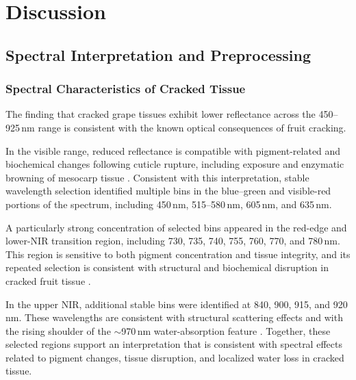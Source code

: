 \chapter{Discussion}
\label{chap:discussion}


\section{Spectral Interpretation and Preprocessing}
\label{sec:physiology_preprocessing}

\subsection{Spectral Characteristics of Cracked Tissue}
\noindent
The finding that cracked grape tissues exhibit lower reflectance across the 450--925\,nm range is consistent with the known optical consequences of fruit cracking.

\medskip\noindent
In the visible range, reduced reflectance is compatible with pigment-related and biochemical changes following cuticle rupture, including exposure and enzymatic browning of mesocarp tissue \parencite{Wang2015FruitQualitySpectroscopy, Gitelson1994ChlorophyllReflectance, santos2023molecular, Moon2020EnzymaticBrowning}. Consistent with this interpretation, stable wavelength selection identified multiple bins in the blue--green and visible-red portions of the spectrum, including 450\,nm, 515--580\,nm, 605\,nm, and 635\,nm.

\medskip\noindent
A particularly strong concentration of selected bins appeared in the red-edge and lower-NIR transition region, including 730, 735, 740, 755, 760, 770, and 780\,nm. This region is sensitive to both pigment concentration and tissue integrity, and its repeated selection is consistent with structural and biochemical disruption in cracked fruit tissue \parencite{Lu2020OpticalPropertiesReview, Imran2020RedEdgeNIRShoulder}.

\medskip\noindent
In the upper NIR, additional stable bins were identified at 840, 900, 915, and 920\,nm. These wavelengths are consistent with structural scattering effects and with the rising shoulder of the $\sim$970\,nm water-absorption feature \parencite{Cheng2019AppleDRS, Sun2021PeachBruisingOptical, Munera2021PersimmonDamageHSI}. Together, these selected regions support an interpretation that is consistent with spectral effects related to pigment changes, tissue disruption, and localized water loss in cracked tissue.

